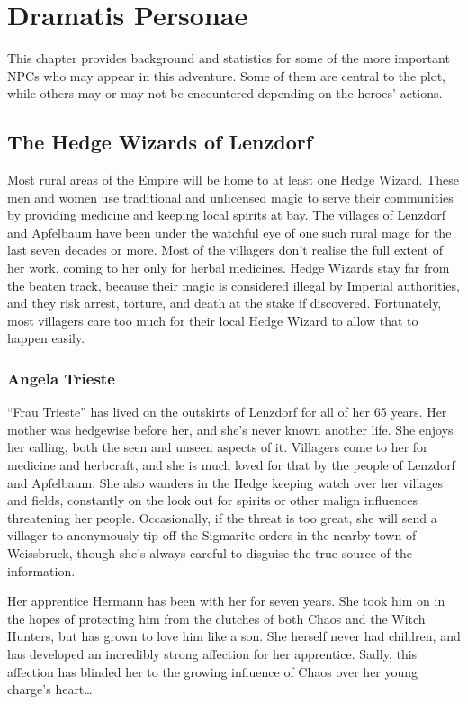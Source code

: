 \chapter{Dramatis Personae}\label{ch:dramatis-personae}
This chapter provides background and statistics for some of the more important
NPCs who may appear in this adventure. Some of them are central to the plot,
while others may or may not be encountered depending on the heroes' actions.

\section{The Hedge Wizards of Lenzdorf}
Most rural areas of the Empire will be home to at least one Hedge Wizard. These
men and women use traditional and unlicensed magic to serve their communities
by providing medicine and keeping local spirits at bay. The villages of Lenzdorf
and Apfelbaum have been under the watchful eye of one such rural mage for
the last seven decades or more. Most of the villagers don't realise the full
extent of her work, coming to her only for herbal medicines. Hedge Wizards stay
far from the beaten track, because their magic is considered illegal by Imperial
authorities, and they risk arrest, torture, and death at the stake if
discovered. Fortunately, most villagers care too much for their local Hedge
Wizard to allow that to happen easily.

\subsection{Angela Trieste}
``Frau Trieste'' has lived on the outskirts of Lenzdorf for all of her 65 years.
Her mother was hedgewise before her, and she's never known another life. She
enjoys her calling, both the seen and unseen aspects of it. Villagers come to
her for medicine and herbcraft, and she is much loved for that by the people of
Lenzdorf and Apfelbaum. She also wanders in the Hedge keeping watch over her
villages and fields, constantly on the look out for spirits or other malign
influences threatening her people. Occasionally, if the threat is too great,
she will send a villager to anonymously tip off the Sigmarite orders in the
nearby town of Weissbruck, though she's always careful to disguise the true
source of the information.

Her apprentice Hermann has been with her for seven years. She took him on in
the hopes of protecting him from the clutches of both Chaos and the Witch
Hunters, but has grown to love him like a son. She herself never had children,
and has developed an incredibly strong affection for her apprentice. Sadly, this
affection has blinded her to the growing influence of Chaos over her young
charge's heart\ldots

